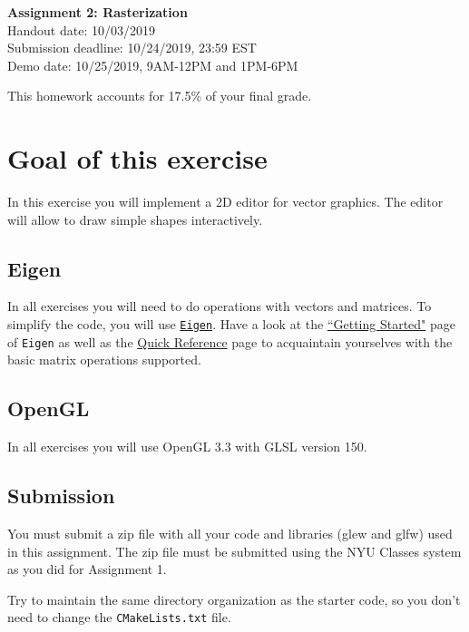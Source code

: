 \documentclass[11pt]{article}
\begin{document}
\hspace{50pt}

\begin{center}

{\Huge \textbf{Assignment 2: Rasterization}}\\
\vspace{10pt}
Handout date: 10/03/2019\\
Submission deadline: 10/24/2019,  23:59 EST\\
Demo date: 10/25/2019, 9AM-12PM and 1PM-6PM
\end{center}

\noindent This homework accounts for 17.5\% of your final grade. 

\section*{Goal of this exercise}
In this exercise you will implement a 2D editor for vector graphics. The editor will allow to draw simple shapes interactively.

\subsection*{Eigen}
In all exercises you will need to do operations with vectors and matrices. To simplify the code, you will use \href{http://eigen.tuxfamily.org/}{\texttt{Eigen}}. 
Have a look at the \href{http://eigen.tuxfamily.org/dox/GettingStarted.html}{``Getting Started"} page of \texttt{Eigen} as well as the \href{http://eigen.tuxfamily.org/dox/group__QuickRefPage.html}{Quick Reference} page to acquaintain yourselves with the basic matrix operations supported. 

\subsection*{OpenGL}
In all exercises you will use OpenGL 3.3 with GLSL version 150.

\subsection*{Submission}

You must submit a zip file with all your code and libraries (glew and glfw) used in this assignment. The zip file must be submitted using the NYU Classes system as you did for Assignment 1. 

Try to maintain the same directory organization as the starter code, so you don't need to change the \texttt{CMakeLists.txt} file.
\end{document}
